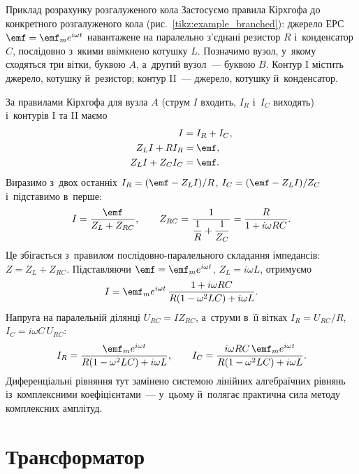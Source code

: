 \begin{Example}[unbreakable]{Приклад розрахунку розгалуженого кола}
Застосуємо правила Кірхгофа до конкретного розгалуженого кола (рис.~\ref{tikz:example_branched}): джерело ЕРС $\emf = \emf_m e^{i\omega t}$ навантажене на паралельно з'єднані резистор $R$ і~конденсатор $C$, послідовно з~якими ввімкнено котушку $L$. Позначимо вузол, у~якому сходяться три вітки, буквою $A$, а~другий вузол~--- буквою $B$. Контур I містить джерело, котушку й~резистор; контур II~--- джерело, котушку й~конденсатор.


За правилами Кірхгофа для вузла $A$ (струм $I$ входить, $I_R$ і~$I_C$ виходять) і~контурів I та II маємо
\begin{align}
	I &= I_R + I_C, \label{eq:example_KCL} \\
	Z_L I + R I_R &= \emf, \label{eq:example_KVL_I} \\
	Z_L I + Z_C I_C &= \emf. \label{eq:example_KVL_II}
\end{align}
Виразимо з~двох останніх $I_R = (\emf - Z_L I)/R$, $I_C = (\emf - Z_L I)/Z_C$ і~підставимо в~перше:
\begin{equation*}
	I = \frac{\emf}{Z_L + Z_{RC}}, \qquad
	Z_{RC} = \frac{1}{\dfrac{1}{R} + \dfrac{1}{Z_C}} = \frac{R}{1 + i\omega RC}.
\end{equation*}
Це збігається з~правилом послідовно-паралельного складання імпедансів: $Z = Z_L + Z_{RC}$. Підставляючи $\emf = \emf_m e^{i\omega t}$, $Z_L = i\omega L$, отримуємо
\begin{equation*}
	I = \emf_m e^{i\omega t}\,\frac{1 + i\omega RC}{R(1 - \omega^2 LC) + i\omega L}.
\end{equation*}
Напруга на паралельній ділянці $U_{RC} = I Z_{RC}$, а~струми в~її вітках $I_R = U_{RC}/R$, $I_C = i\omega C\,U_{RC}$:
\begin{equation*}
	I_R = \frac{\emf_m e^{i\omega t}}{R(1 - \omega^2 LC) + i\omega L}, \qquad
	I_C = \frac{i\omega RC\,\emf_m e^{i\omega t}}{R(1 - \omega^2 LC) + i\omega L}.
\end{equation*}
Диференціальні рівняння тут замінено системою лінійних алгебраїчних рівнянь із~комплексними коефіцієнтами~--- у~цьому й~полягає практична сила методу комплексних амплітуд.
\end{Example}

\section{Трансформатор}\hypertarget{transformer}{}
\label{sec:transformer}

